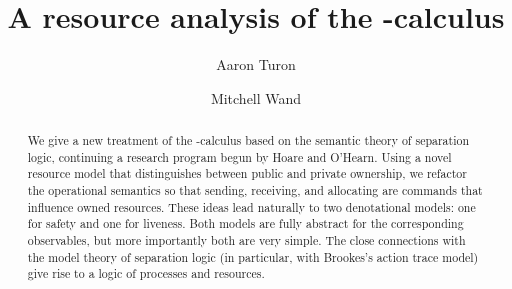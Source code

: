 \documentclass{entcs}
\begin{document}
\def\lastname{Turon and Wand}
\begin{frontmatter}
  \title{A resource analysis of the -calculus} 
  \author{Aaron Turon}
  \author{Mitchell Wand}
  \address{College of Computer and Information Science\\
Northeastern University\\
Boston MA, USA}
\begin{abstract}
We give a new treatment of the -calculus based on the semantic
theory of separation logic, continuing a research program begun by
Hoare and O'Hearn.  Using a novel resource model that distinguishes
between public and private ownership, we refactor the operational
semantics so that sending, receiving, and allocating are commands that
influence owned resources.  These ideas lead naturally to two
denotational models: one for safety and one for liveness.  Both models
are fully abstract for the corresponding observables, but more
importantly both are very simple.  The close connections with the
model theory of separation logic (in particular, with Brookes's action
trace model) give rise to a logic of processes and resources.  
\end{abstract}
\end{frontmatter}

\newcommand{\CA}{\mathcal{A}}
\newcommand{\CO}{\mathcal{O}}
\newcommand{\CB}{\mathcal{B}}
\newcommand{\CM}{\mathcal{M}}
\newcommand{\CE}{\mathcal{E}}
\newcommand{\CS}{\mathcal{S}}
\newcommand{\CD}{\mathcal{D}}
\newcommand{\CJ}{\mathcal{J}}
\newcommand{\CL}{\mathcal{L}}
\newcommand{\CC}{\mathcal{C}}
\newcommand{\CP}{\mathcal{P}}
\newcommand{\CR}{\mathcal{R}}
\newcommand{\CT}{\mathcal{T}}
\newcommand{\CU}{\mathcal{U}}
\newcommand{\CN}{\mathcal{N}}
\newcommand{\CI}{\mathcal{I}}

\newcommand{\Sem}[2]{\left\llbracket #1 \right\rrbracket^{#2}}
\newcommand{\SemB}[1]{\left\llbracket #1 \right\rrbracket}

\newcommand{\LSem}[2]{\mathcal{L}\!\left\llbracket #1 \right\rrbracket^{#2}}
\newcommand{\LSemB}[1]{\mathcal{L}\!\left\llbracket #1 \right\rrbracket}

\newcommand{\ASem}[2]{\llparenthesis #1 \rrparenthesis #2}
\newcommand{\ASemB}[1]{\llparenthesis #1 \rrparenthesis }

\newcommand{\Ob}[2]{\mathcal{O}\!\left\llbracket #1 \right\rrbracket \! #2}
\newcommand{\ObB}[1]{\mathcal{O}\!\left\llbracket #1 \right\rrbracket }

\newcommand{\LOb}[2]{\mathcal{LO}\!\left\llbracket #1 \right\rrbracket \! #2}
\newcommand{\LObB}[1]{\mathcal{LO}\!\left\llbracket #1 \right\rrbracket }
\end{document}
